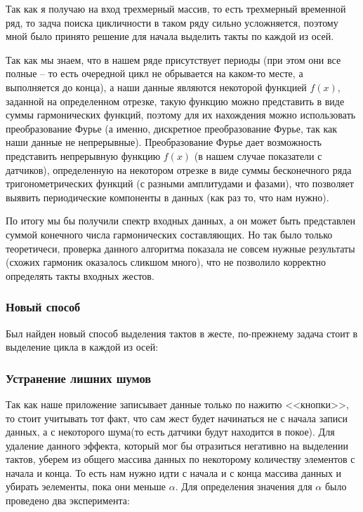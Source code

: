 Так как я получаю на вход трехмерный массив, то есть трехмерный временной ряд, то задча поиска цикличности в таком ряду сильно усложняется, поэтому мной было принято решение для начала выделить такты по каждой из осей.

Так как мы знаем, что в нашем ряде присутствует периоды (при этом они все полные – то есть очередной цикл не обрывается на каком-то месте, а выполняется до конца), а наши данные являются некоторой функцией $f(x)$, заданной на определенном отрезке, такую функцию можно представить в виде суммы гармонических функций, поэтому для их нахождения можно использовать преобразование Фурье (а именно, дискретное преобразование Фурье, так как наши данные не непрерывные). Преобразование Фурье
дает возможность представить непрерывную функцию $f(x)$ (в нашем случае показатели с датчиков), определенную на некотором отрезке в виде суммы бесконечного ряда тригонометрических функций (с разными амплитудами и фазами), что позволяет выявить периодические компоненты в данных (как раз то, что нам нужно).

По итогу мы бы получили спектр входных данных, а он может быть представлен суммой конечного числа гармонических составляющих. Но так было только теоретичеси, проверка данного алгоритма показала не совсем нужные результаты (схожих гармоник оказалось сликшом много), что не позволило корректно определять такты входных жестов.

\subsubsection{Новый способ}
Был найден новый способ выделения тактов в жесте, по-прежнему задача стоит в выделение цикла в каждой из осей:
\subsubsection{Устранение лишних шумов}
Так как наше приложение записывает данные только по нажитю <<кнопки>>, то стоит учитывать тот факт, что сам жест будет начинаться не с начала записи данных, а с некоторого шума(то есть датчики будут находится в покое). Для удаление данного эффекта, который мог бы отразиться негативно на выделении тактов, уберем из общего массива данных по некоторому количеству элементов с начала и конца. То есть нам нужно идти с начала и с конца массива данных и убирать эелементы, пока они меньше $\alpha$. Для определения значения для $\alpha$ было проведено два эксперимента:

